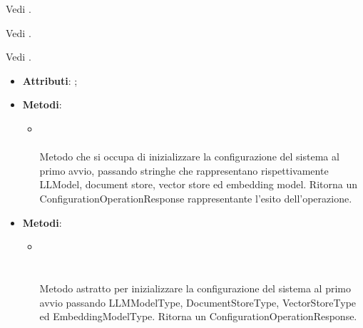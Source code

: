 \documentclass[10pt, a4paper]{article}
\begin{document}
Vedi .

Vedi .

Vedi .

\label{SetConfigurationControllerDettaglio}
\begin{itemize}
    \item \textbf{Attributi}: ;
    \item \textbf{Metodi}:
    \begin{itemize}
        \item {}\\\\
        Metodo che si occupa di inizializzare la configurazione del sistema al primo avvio, passando stringhe che rappresentano rispettivamente LLModel, document store, vector store ed embedding model. Ritorna un ConfigurationOperationResponse rappresentante l'esito dell'operazione.
    \end{itemize}
\end{itemize}

\label{SetConfigurationPortDettaglio}
\begin{itemize}
    \item \textbf{Metodi}:
    \begin{itemize}
        \item {}\\ \\ \\
        Metodo astratto per inizializzare la configurazione del sistema al primo avvio passando LLMModelType, DocumentStoreType, VectorStoreType ed EmbeddingModelType. Ritorna un ConfigurationOperationResponse.
    \end{itemize}
\end{itemize}
\end{document}
